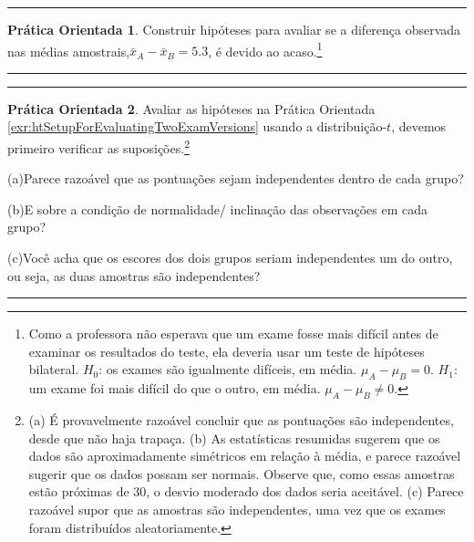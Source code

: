 \documentclass[
]{book}
\theoremstyle{definition}
\theoremstyle{definition}
\theoremstyle{definition}
\newtheorem{exercise}{Prática Orientada}[chapter]
\theoremstyle{definition}
\theoremstyle{remark}
\begin{document}
\begin{center}\rule{0.5\linewidth}{0.5pt}\end{center}

\begin{exercise}
\protect\hypertarget{exr:htSetupForEvaluatingTwoExamVersions}{}{\label{exr:htSetupForEvaluatingTwoExamVersions} }Construir hipóteses para avaliar se a diferença observada nas médias amostrais,\(\bar{x}_A - \bar{x}_B=5.3\), é devido ao acaso.\footnote{Como a professora não esperava que um exame fosse mais difícil antes de examinar os resultados do teste, ela deveria usar um teste de hipóteses bilateral. \(H_0\): os exames são igualmente difíceis, em média. \(\mu_A - \mu_B = 0\). \(H_1\): um exame foi mais difícil do que o outro, em média. \(\mu_A - \mu_B \neq 0\).}
\end{exercise}

\begin{center}\rule{0.5\linewidth}{0.5pt}\end{center}

\begin{center}\rule{0.5\linewidth}{0.5pt}\end{center}

\begin{exercise}
\protect\hypertarget{exr:conditionsForTDistForEvaluatingTwoExamVersions}{}{\label{exr:conditionsForTDistForEvaluatingTwoExamVersions} }Avaliar as hipóteses na Prática Orientada \ref{exr:htSetupForEvaluatingTwoExamVersions} usando a distribuição-\(t\), devemos primeiro verificar as suposições.\footnote{(a) É provavelmente razoável concluir que as pontuações são independentes, desde que não haja trapaça. (b) As estatísticas resumidas sugerem que os dados são aproximadamente simétricos em relação à média, e parece razoável sugerir que os dados possam ser normais. Observe que, como essas amostras estão próximas de 30, o desvio moderado dos dados seria aceitável. (c) Parece razoável supor que as amostras são independentes, uma vez que os exames foram distribuídos aleatoriamente.}

(a)Parece razoável que as pontuações sejam independentes dentro de cada grupo?

(b)E sobre a condição de normalidade/ inclinação das observações em cada grupo?

(c)Você acha que os escores dos dois grupos seriam independentes um do outro, ou seja, as duas amostras são independentes?
\end{exercise}

\begin{center}\rule{0.5\linewidth}{0.5pt}\end{center}
\end{document}
